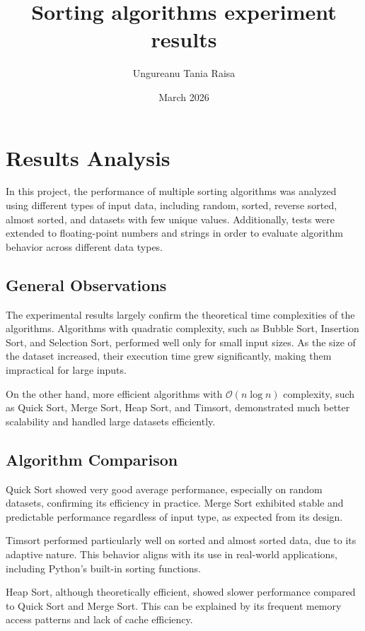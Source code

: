\documentclass{article}
\title{Sorting algorithms experiment results}
\author{Ungureanu Tania Raisa}
\date{March 2026}
\begin{document}
\maketitle

\section{Results Analysis}

In this project, the performance of multiple sorting algorithms was analyzed using different types of input data, including random, sorted, reverse sorted, almost sorted, and datasets with few unique values. Additionally, tests were extended to floating-point numbers and strings in order to evaluate algorithm behavior across different data types.

\subsection{General Observations}

The experimental results largely confirm the theoretical time complexities of the algorithms. Algorithms with quadratic complexity, such as Bubble Sort, Insertion Sort, and Selection Sort, performed well only for small input sizes. As the size of the dataset increased, their execution time grew significantly, making them impractical for large inputs.

On the other hand, more efficient algorithms with $\mathcal{O}(n \log n)$ complexity, such as Quick Sort, Merge Sort, Heap Sort, and Timsort, demonstrated much better scalability and handled large datasets efficiently.

\subsection{Algorithm Comparison}

Quick Sort showed very good average performance, especially on random datasets, confirming its efficiency in practice. Merge Sort exhibited stable and predictable performance regardless of input type, as expected from its design.

Timsort performed particularly well on sorted and almost sorted data, due to its adaptive nature. This behavior aligns with its use in real-world applications, including Python's built-in sorting functions.

Heap Sort, although theoretically efficient, showed slower performance compared to Quick Sort and Merge Sort. This can be explained by its frequent memory access patterns and lack of cache efficiency.
\end{document}
